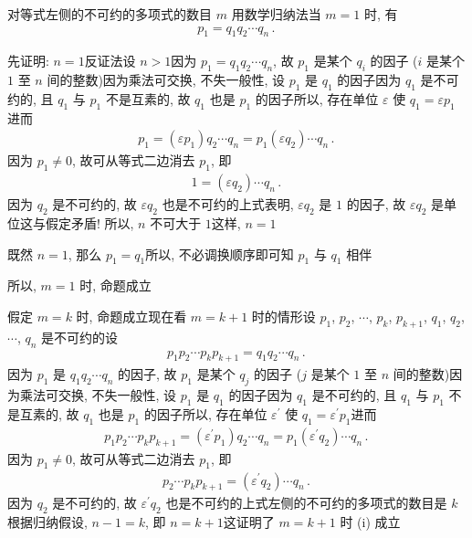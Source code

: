 \begin{pf}
    对等式左侧的不可约的多项式的数目 $m$ 用数学归纳法\period 当 $m = 1$ 时, 有
    \begin{align*}
        p_1 = q_1 q_2 \cdots q_n \period
    \end{align*}

    先证明: $n = 1$\period 反证法\period 设 $n > 1$\period 因为 $p_1 = q_1 q_2 \cdots q_n$, 故 $p_1$ 是某个 $q_i$ 的因子 ($i$ 是某个 $1$ 至 $n$ 间的整数)\period 因为乘法可交换, 不失一般性, 设 $p_1$ 是 $q_1$ 的因子\period 因为 $q_1$ 是不可约的, 且 $q_1$ 与 $p_1$ 不是互素的, 故 $q_1$ 也是 $p_1$ 的因子\period 所以, 存在单位 $\varepsilon$ 使 $q_1 = \varepsilon p_1$\period 进而
    \begin{align*}
        p_1 = (\varepsilon p_1) q_2 \cdots q_n = p_1 (\varepsilon q_2) \cdots q_n \period
    \end{align*}
    因为 $p_1 \neq 0$, 故可从等式二边消去 $p_1$, 即
    \begin{align*}
        1 = (\varepsilon q_2) \cdots q_n \period
    \end{align*}
    因为 $q_2$ 是不可约的, 故 $\varepsilon q_2$ 也是不可约的\period 上式表明, $\varepsilon q_2$ 是 $1$ 的因子, 故 $\varepsilon q_2$ 是单位\period 这与假定矛盾! 所以, $n$ 不可大于 $1$\period 这样, $n = 1$\period

    既然 $n = 1$, 那么 $p_1 = q_1$\period 所以, 不必调换顺序即可知 $p_1$ 与 $q_1$ 相伴\period

    所以, $m=1$ 时, 命题成立\period

    假定 $m=k$ 时, 命题成立\period 现在看 $m=k+1$ 时的情形\period 设 $p_1$, $p_2$, $\cdots$, $p_k$, $p_{k+1}$, $q_1$, $q_2$, $\cdots$, $q_n$ 是不可约的\period 设
    \begin{align*}
        p_1 p_2 \cdots p_k p_{k+1} = q_1 q_2 \cdots q_n \period
    \end{align*}
    因为 $p_1$ 是 $q_1 q_2 \cdots q_n$ 的因子, 故 $p_1$ 是某个 $q_j$ 的因子 ($j$ 是某个 $1$ 至 $n$ 间的整数)\period 因为乘法可交换, 不失一般性, 设 $p_1$ 是 $q_1$ 的因子\period 因为 $q_1$ 是不可约的, 且 $q_1$ 与 $p_1$ 不是互素的, 故 $q_1$ 也是 $p_1$ 的因子\period 所以, 存在单位 $\varepsilon^{\prime}$ 使 $q_1 = \varepsilon^{\prime} p_1$\period 进而
    \begin{align*}
        p_1 p_2 \cdots p_k p_{k+1} = (\varepsilon^{\prime} p_1) q_2 \cdots q_n = p_1 (\varepsilon^{\prime} q_2) \cdots q_n \period
    \end{align*}
    因为 $p_1 \neq 0$, 故可从等式二边消去 $p_1$, 即
    \begin{align*}
        p_2 \cdots p_k p_{k+1} = (\varepsilon^{\prime} q_2) \cdots q_n \period
    \end{align*}
    因为 $q_2$ 是不可约的, 故 $\varepsilon^{\prime} q_2$ 也是不可约的\period 上式左侧的不可约的多项式的数目是 $k$\period 根据归纳假设, $n-1 = k$, 即 $n = k+1$\period 这证明了 $m=k+1$ 时 (i) 成立\period


\end{pf}
